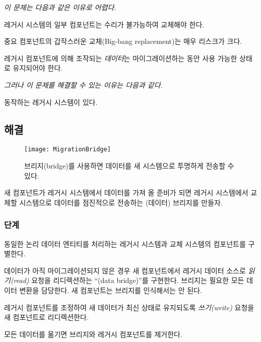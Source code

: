 \documentclass[a4paper,10pt,twoside]{book}
\begin{document}
\emph{이 문제는 다음과 같은 이유로 어렵다.}

\begin{bulletlist}
\item 레거시 시스템의 일부 컴포넌트는 수리가 불가능하여 교체해야 한다.

\item 중요 컴포넌트의 갑작스러운 교체(Big-bang replacement)는 매우 리스크가 크다.

\item 레거시 컴포넌트에 의해 조작되는 \emph{데이터}는 마이그레이션하는 동안 사용 가능한 상태로 유지되어야 한다.
\end{bulletlist}

\emph{그러나 이 문제를 해결할 수 있는 이유는 다음과 같다.}

\begin{bulletlist}
\item 동작하는 레거시 시스템이 있다.
\end{bulletlist}

\subsection*{해결}

\begin{figure}
\begin{center}
\texttt{[image: MigrationBridge]}
\caption{브리지(bridge)를 사용하면 데이터를 새 시스템으로 투명하게 전송할 수 있다.}
\end{center}
\end{figure}

새 컴포넌트가 레거시 시스템에서 데이터를 가져 올 준비가 되면 레거시 시스템에서 교체할 시스템으로 데이터를 점진적으로 전송하는 (데이터) 브리지를 만들자.

\subsubsection*{단계}

\begin{bulletlist}
\item 동일한 논리 데이터 엔티티를 처리하는 레거시 시스템과 교체 시스템의 컴포넌트를 구별한다.

\item 데이터가 아직 마이그레이션되지 않은 경우 새 컴포넌트에서 레거시 데이터 소스로 \emph{읽기(read)} 요청을 리디렉션하는 ``(data bridge)''를 구현한다. 브리지는 필요한 모든 데이터 변환을 담당한다. 새 컴포넌트는 브리지를 인식해서는 안 된다.

\item 레거시 컴포넌트를 조정하여 새 데이터가 최신 상태로 유지되도록 \emph{쓰기(write)} 요청을 새 컴포넌트로 리디렉션한다.

\item 모든 데이터를 옮기면 브리지와 레거시 컴포넌트를 제거한다.
\end{bulletlist}
\end{document}

